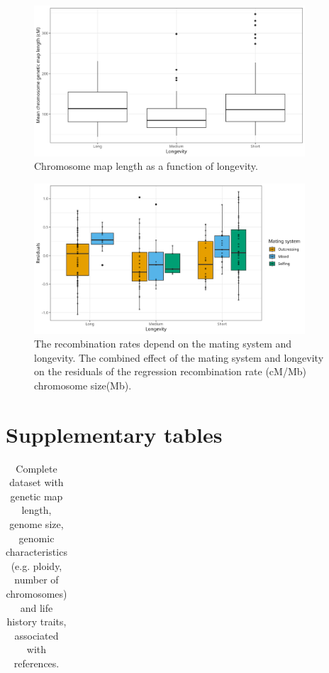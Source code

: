 \documentclass{article}
\begin{document}
\begin{figure}[h!]
  \includegraphics[width=0.9\textwidth]{figures/FigS4.jpeg}
  \centering
  \caption{Chromosome map length as a function of longevity.
  }
  \label{figure:FigS4}
\end{figure}


\begin{figure}[h!]
  \includegraphics[width=0.9\textwidth]{figures/FigS5.jpeg}
  \centering
  \caption{The recombination rates depend on the mating system and longevity. The combined effect of the mating system and longevity on the residuals of the regression recombination rate (cM/Mb) ~ chromosome size(Mb).
  }
  \label{figure:FigS5}
\end{figure}




\clearpage

\section*{Supplementary tables}

\renewcommand{\thetable}{S\arabic{table}}

\setcounter{table}{0}


\begin{table}[h!]
\centering{}
\caption{Complete dataset with genetic map length, genome size, genomic characteristics (e.g. ploidy, number of chromosomes) and life history traits, associated with references.}
\begin{tabular}{cccccccc}
\end{tabular}
\label{table:tableS1}
\end{table}
\end{document}
